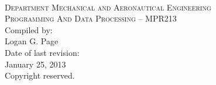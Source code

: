 \begin{titlepage}
    \thispagestyle{empty}
    \begin{center}
        \ \\
        \vspace{2cm}
        {\Large \textsc{Department Mechanical and Aeronautical
                        Engineering}} \\
        \vspace{1.5cm}
        {\huge \textsc{Programming And Data Processing -- MPR213}} \\
        \vspace{3cm}
        {\large Compiled by:} \\
        \vspace{0.2cm}
        {\large Logan G. Page} \\
        \vspace{1cm}
        {\large Date of last revision:} \\
        \vspace{0.2cm}
        {\large January 25, 2013} \\
        \vspace{1cm}
        {\large Copyright reserved.} \\
    \end{center}
\end{titlepage}
